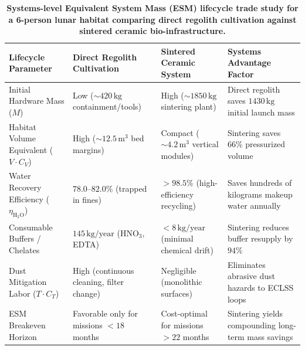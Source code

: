 \begin{table}[t!]
\small
\centering
\caption{\textbf{Systems-level Equivalent System Mass (ESM) lifecycle trade study for a 6-person lunar habitat comparing direct regolith cultivation against sintered ceramic bio-infrastructure.}}
\label{tab:esm_comparison}
\begin{tabularx}{\textwidth}{lXXX}
\toprule
\textbf{Lifecycle Parameter} & \textbf{Direct Regolith Cultivation} & \textbf{Sintered Ceramic System} & \textbf{Systems Advantage Factor} \\
\midrule
Initial Hardware Mass ($M$) & Low ($\sim 420\,\mathrm{kg}$ containment/tools)\cite{ming1989lunar} & High ($\sim 1850\,\mathrm{kg}$ sintering plant)\cite{ming1989lunar,meek1993mechanical} & Direct regolith saves $1430\,\mathrm{kg}$ initial launch mass \\
\addlinespace
Habitat Volume Equivalent ($V \cdot C_V$) & High ($\sim 12.5\,\mathrm{m}^3$ bed margins)\cite{paul2022plants,ming1989lunar,hanford2006baseline} & Compact ($\sim 4.2\,\mathrm{m}^3$ vertical modules)\cite{paul2022plants,ming1989lunar} & Sintering saves $66\%$ pressurized volume \\
\addlinespace
Water Recovery Efficiency ($\eta_{\mathrm{H}_2\mathrm{O}}$) & $78.0\text{--}82.0\%$ (trapped in fines)\cite{paul2022plants,ming1989lunar} & $>98.5\%$ (high-efficiency recycling)\cite{ming1989lunar} & Saves hundreds of kilograms makeup water annually\cite{ming1989lunar,chinnannan2025spirulina} \\
\addlinespace
Consumable Buffers / Chelates & $145\,\mathrm{kg/year}$ ($\mathrm{HNO}_3$, EDTA)\cite{ming1989lunar,hendrix2019measurement} & $<8\,\mathrm{kg/year}$ (minimal chemical drift)\cite{ming1989lunar} & Sintering reduces buffer resupply by $94\%$ \\
\addlinespace
Dust Mitigation Labor ($T \cdot C_T$) & High (continuous cleaning, filter change)\cite{paul2022plants,ming1989lunar} & Negligible (monolithic surfaces)\cite{ming1989lunar} & Eliminates abrasive dust hazards to ECLSS loops\cite{paul2022plants,ming1989lunar,hendrix2024reactivity} \\
\addlinespace
ESM Breakeven Horizon & Favorable only for missions $<18$ months\cite{ming1989lunar} & Cost-optimal for missions $>22$ months\cite{ming1989lunar} & Sintering yields compounding long-term mass savings\cite{ming1989lunar,min2023protection} \\
\bottomrule
\end{tabularx}
\end{table}
